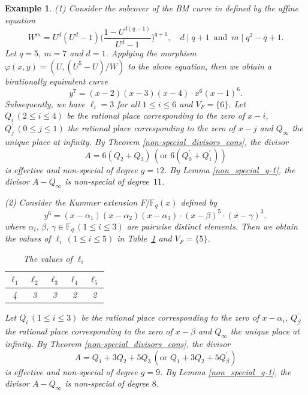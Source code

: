 \documentclass[journal,12pt,onecolumn]{IEEEtran}
\newtheorem{example}[theorem]{Example}
\begin{document}
\begin{example}\label{non-special_divisors_cons_ex}
    {\rm (1)} Consider the subcover of the BM curve in \cite[Rem. 3.2]{mendozaExplicitEquationsMaximal2022} defined by the affine equation
    \[
        W^m = U^d(U^d-1)\bigg( \frac{1-U^{d(q-1)}}{U^d-1} \bigg)^{q+1},\quad d\mid q+1\,\text{ and }\,m\mid q^2-q+1.
    \]Let $q = 5$, $m = 7$ and $d = 1$. Applying the morphism $\varphi(x,y) = (U,(U^5-U)/W)$ to the above equation, then we obtain a birationally equivalent curve
    \[
        y^7 = (x-2)(x-3)(x-4)\cdot x^6(x-1)^6.
    \]
    Subsequently, we have $\ell_i = 3$ for all $1\le i\le 6$ and $V_F = \{6\}$. Let $Q_i\,(2\le i\le 4)$ be the rational place corresponding to the zero of $x-i$, $Q_j^\prime\,(0\le j\le 1)$ the rational place corresponding to the zero of $x-j$ and $Q_\infty$ the unique place at infinity. By Theorem \ref{non-special_divisors_cons}, the divisor 
    \[
        A = 6(Q_2+Q_3) \,(\text{or } 6(Q_0^\prime+Q_1^\prime))
    \]
    is effective and non-special of degree $g=12$. By Lemma \ref{non_special_g-1}, the divisor $A-Q_\infty$ is non-special of degree~$11$.  

    {\rm (2)} Consider the Kummer extension $F/\mathbb{F}_q(x)$ defined by 
    \[
        y^6 = (x-\alpha_1)(x-\alpha_2)(x-\alpha_3)\cdot(x-\beta)^5\cdot(x-\gamma)^3, 
    \]
    where $\alpha_i,\,\beta,\,\gamma\in\mathbb{F}_q \,(1\le i\le 3)$ are pairwise distinct elements. Then we obtain the values of $\ell_i\,(1\le i\le 5)$ in Table~\ref{tab:ell_i_non-special_divisors_cons_ex_2} and $V_F = \{5\}$.
    \begin{table}[ht]
	\centering
	\begin{tabular}{ccccc}
		\hline
        $\ell_1$ & $\ell_2$ & $\ell_3$ & $\ell_4$ & $\ell_5$  \\
        \hline
		4      & 3      & 3      & 2      & 2     \\
        \hline
	\end{tabular}
	\caption{The values of $\ell_i$}
	\label{tab:ell_i_non-special_divisors_cons_ex_2}
    \end{table}
    Let $Q_i\,(1\le i\le 3)$ be the rational place corresponding to the zero of $x-\alpha_i$, $Q_\beta^\prime$ the rational place corresponding to the zero of $x-\beta$ and $Q_\infty$ the unique place at infinity. By Theorem \ref{non-special_divisors_cons}, the divisor
    \[
        A = Q_1 + 3Q_2 + 5 Q_3\,(\text{or } Q_1 + 3Q_2 + 5Q_\beta^\prime )
    \]
    is effective and non-special of degree $g=9$. By Lemma \ref{non_special_g-1}, the divisor $A-Q_\infty$ is non-special of degree $8$. 


\end{example}
\end{document}
